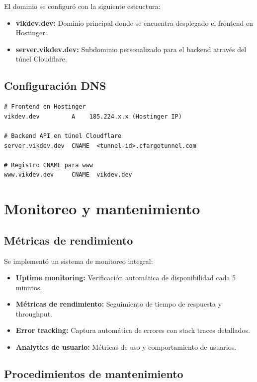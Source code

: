 \documentclass[12pt,a4paper]{report}
\begin{document}
El dominio se configuró con la siguiente estructura:

\begin{itemize}
\item \textbf{vikdev.dev:} Dominio principal donde se encuentra desplegado el frontend en Hostinger.
\item \textbf{server.vikdev.dev:} Subdominio personalizado para el backend através del túnel Cloudflare.
\end{itemize}

\subsection{Configuración DNS}

\begin{lstlisting}[language=text, caption=Configuración de dominios]
# Frontend en Hostinger
vikdev.dev         A    185.224.x.x (Hostinger IP)

# Backend API en túnel Cloudflare  
server.vikdev.dev  CNAME  <tunnel-id>.cfargotunnel.com

# Registro CNAME para www
www.vikdev.dev     CNAME  vikdev.dev
\end{lstlisting}

\section{Monitoreo y mantenimiento}

\subsection{Métricas de rendimiento}

Se implementó un sistema de monitoreo integral:

\begin{itemize}
\item \textbf{Uptime monitoring:} Verificación automática de disponibilidad cada 5 minutos.
\item \textbf{Métricas de rendimiento:} Seguimiento de tiempo de respuesta y throughput.
\item \textbf{Error tracking:} Captura automática de errores con stack traces detallados.
\item \textbf{Analytics de usuario:} Métricas de uso y comportamiento de usuarios.
\end{itemize}

\subsection{Procedimientos de mantenimiento}
\end{document}
